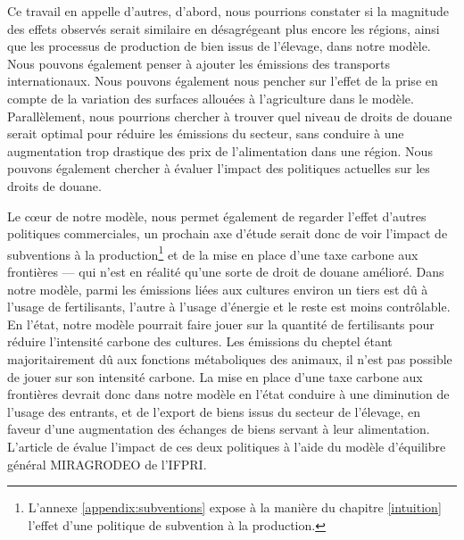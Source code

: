 Ce travail en appelle d'autres, d'abord, nous pourrions constater si la magnitude des effets observés serait similaire en désagrégeant plus encore les régions, ainsi que les processus de production de bien issus de l'élevage, dans notre modèle. Nous pouvons également penser à ajouter les émissions des transports internationaux. Nous pouvons également nous pencher sur l'effet de la prise en compte de la variation des surfaces allouées à l'agriculture dans le modèle. Parallèlement, nous pourrions chercher à trouver quel niveau de droits de douane serait optimal pour réduire les émissions du secteur, sans conduire à une augmentation trop drastique des prix de l'alimentation dans une région. Nous pouvons également chercher à évaluer l'impact des politiques actuelles sur les droits de douane.

Le cœur de notre modèle, nous permet également de regarder l'effet d'autres politiques commerciales, un prochain axe d'étude serait donc de voir l'impact de subventions à la production\footnote{L'annexe \ref{appendix:subventions} expose à la manière du chapitre \ref{intuition} l'effet d'une politique de subvention à la production.} et de la mise en place d'une taxe carbone aux frontières — qui n'est en réalité qu'une sorte de droit de douane amélioré. Dans notre modèle, parmi les émissions liées aux cultures environ un tiers est dû à l'usage de fertilisants, l'autre à l'usage d'énergie et le reste est moins contrôlable. En l'état, notre modèle pourrait faire jouer sur la quantité de fertilisants pour réduire l'intensité carbone des cultures. Les émissions du cheptel étant majoritairement dû aux fonctions métaboliques des animaux, il n'est pas possible de jouer sur son intensité carbone. La mise en place d'une taxe carbone aux frontières devrait donc dans notre modèle en l'état conduire à une diminution de l'usage des entrants, et de l'export de biens issus du secteur de l'élevage, en faveur d'une augmentation des échanges de biens servant à leur alimentation. L'article de \cite{Laborde2020} évalue l'impact de ces deux politiques à l'aide du modèle d'équilibre général MIRAGRODEO de l'IFPRI.

